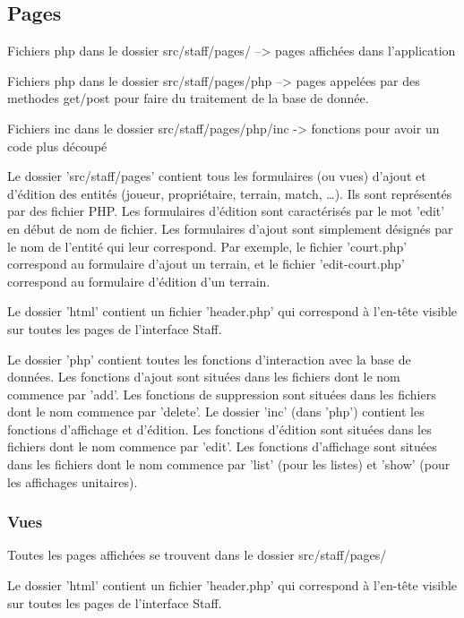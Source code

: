 \documentclass{article}
\begin{document}
\subsection{Pages}

Fichiers php dans le dossier src/staff/pages/ –> pages affichées dans l'application

Fichiers php dans le dossier src/staff/pages/php –> pages appelées par des methodes get/post pour faire du traitement de la base de donnée.

Fichiers inc dans le dossier src/staff/pages/php/inc -> fonctions pour avoir un code plus découpé

Le dossier 'src/staff/pages' contient tous les formulaires (ou vues) d'ajout et d'édition des entités (joueur, propriétaire, terrain, match, …). Ils sont représentés par des fichier PHP. Les formulaires d'édition sont caractérisés par le mot 'edit' en début de nom de fichier. Les formulaires d'ajout sont simplement désignés par le nom de l'entité qui leur correspond. Par exemple, le fichier 'court.php' correspond au formulaire d'ajout un terrain, et le fichier 'edit-court.php' correspond au formulaire d'édition d'un terrain.

Le dossier 'html' contient un fichier 'header.php' qui correspond à l'en-tête visible sur toutes les pages de l'interface Staff.

Le dossier 'php' contient toutes les fonctions d'interaction avec la base de données. Les fonctions d'ajout sont situées dans les fichiers dont le nom commence par 'add'. Les fonctions de suppression sont situées dans les fichiers dont le nom commence par 'delete'.
Le dossier 'inc' (dans 'php') contient les fonctions d'affichage et d'édition. Les fonctions d'édition sont situées dans les fichiers dont le nom commence par 'edit'. Les fonctions d'affichage sont situées dans les fichiers dont le nom commence par 'list' (pour les listes) et 'show' (pour les affichages unitaires).


\subsubsection{Vues}

Toutes les pages affichées se trouvent dans le dossier src/staff/pages/

Le dossier 'html' contient un fichier 'header.php' qui correspond à l'en-tête visible sur toutes les pages de l'interface Staff.

\end{document}
